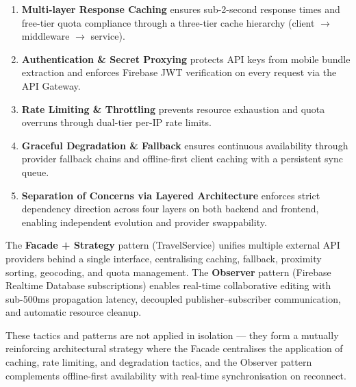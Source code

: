 \documentclass[12pt, a4paper]{article}
\begin{document}
\begin{enumerate}
  \item \textbf{Multi-layer Response Caching} ensures sub-2-second response times and free-tier quota compliance through a three-tier cache hierarchy (client $\to$ middleware $\to$ service).

  \item \textbf{Authentication \& Secret Proxying} protects API keys from mobile bundle extraction and enforces Firebase JWT verification on every request via the API Gateway.

  \item \textbf{Rate Limiting \& Throttling} prevents resource exhaustion and quota overruns through dual-tier per-IP rate limits.

  \item \textbf{Graceful Degradation \& Fallback} ensures continuous availability through provider fallback chains and offline-first client caching with a persistent sync queue.

  \item \textbf{Separation of Concerns via Layered Architecture} enforces strict dependency direction across four layers on both backend and frontend, enabling independent evolution and provider swappability.
\end{enumerate}

The \textbf{Facade + Strategy} pattern (TravelService) unifies multiple external API providers behind a single interface, centralising caching, fallback, proximity sorting, geocoding, and quota management. The \textbf{Observer} pattern (Firebase Realtime Database subscriptions) enables real-time collaborative editing with sub-500ms propagation latency, decoupled publisher--subscriber communication, and automatic resource cleanup.

These tactics and patterns are not applied in isolation --- they form a mutually reinforcing architectural strategy where the Facade centralises the application of caching, rate limiting, and degradation tactics, and the Observer pattern complements offline-first availability with real-time synchronisation on reconnect.
\end{document}
